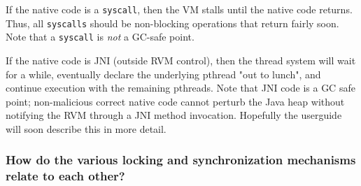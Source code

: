 If the native code is a {\tt syscall}, then the VM stalls until the native
code returns.  Thus, all {\tt syscalls} should be non-blocking
operations that return fairly soon.  Note that a {\tt syscall} is 
{\em not} a GC-safe point.

If the native code is JNI (outside RVM control), then the thread system
will wait for a while, eventually declare the underlying pthread "out to
lunch", and continue execution with the remaining pthreads.  Note that 
JNI code is a GC safe point; non-malicious correct native code cannot
perturb the Java heap without notifying the RVM through a JNI method
invocation.  Hopefully the userguide will soon describe this in more
detail.

\subsubsection{How do the various locking and synchronization mechanisms
relate to each other?}

